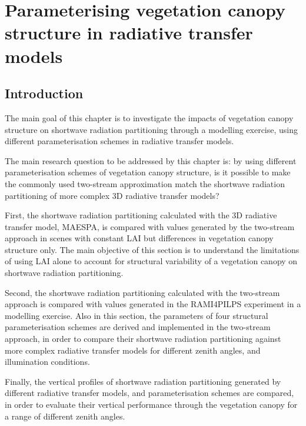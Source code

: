 \documentclass[a4paper,11pt]{report}
\title{}
\author{Renato Kerches Braghiere \\ This document was written in \LaTeX \\ Number of words: 12213}
\date{\today}
\begin{document}
\maketitle
\setcounter{chapter}{3} %

\chapter{Parameterising vegetation canopy structure in radiative transfer models}

\section{Introduction}\label{introduction}
The main goal of this chapter is to investigate the impacts of vegetation canopy structure on shortwave radiation partitioning through a modelling exercise, using different parameterisation schemes in radiative transfer models.

The main research question to be addressed by this chapter is: by using different parameterisation schemes of vegetation canopy structure, is it possible to make the commonly used two-stream approximation \citep{Sellers1985} match the shortwave radiation partitioning of more complex 3D radiative transfer models?

First, the shortwave radiation partitioning calculated with the 3D radiative transfer model, MAESPA, is compared with values generated by the two-stream approach in scenes with constant LAI but differences in vegetation canopy structure only. The main objective of this section is to understand the limitations of using LAI alone to account for structural variability of a vegetation canopy on shortwave radiation partitioning.

Second, the shortwave radiation partitioning calculated with the two-stream approach is compared with values generated in the RAMI4PILPS experiment \citep{Widlowski2011} in a modelling exercise. Also in this section, the parameters of four structural parameterisation schemes \citep{Nilson1971,Kucharik1999,pinty2006,Ni-Meister2010} are derived and implemented in the two-stream approach, in order to compare their shortwave radiation partitioning against more complex radiative transfer models for different zenith angles, and illumination conditions.

Finally, the vertical profiles of shortwave radiation partitioning generated by different radiative transfer models, and parameterisation schemes are compared, in order to evaluate their vertical performance through the vegetation canopy for a range of different zenith angles.
\end{document}
